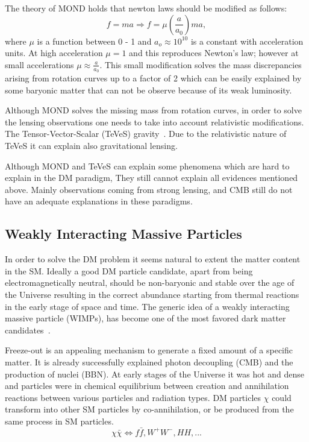 The theory of MOND holds that newton laws should be modified as follows:
\begin{equation}
	f= ma \Rightarrow f= \mu\left(\frac{a}{a_0}\right)ma,
\end{equation}
where $\mu$ is a function between 0 - 1 and $a_o \approx 10^{10}$ is a constant with acceleration units. At high acceleration $\mu =1$ and this reproduces Newton’s law; however at small accelerations $\mu \approx \frac{a}{a_0}$. This small modification solves the mass discrepancies arising from rotation curves up to a factor of 2 which can be easily explained by some baryonic matter that can not be observe because of its weak luminosity.

Although MOND solves the missing mass from rotation curves, in order to solve
the lensing observations one needs to take into account relativistic modifications. The Tensor-Vector-Scalar (TeVeS) gravity~\cite{Bekenstein:2009bd}. Due to the relativistic nature of TeVeS it can explain also gravitational
lensing.

Although MOND and TeVeS can explain some phenomena which are hard to explain in the DM paradigm, They still cannot explain all evidences mentioned above. Mainly observations coming from strong lensing, and CMB still do not have an adequate explanations in these paradigms.


\subsection{Weakly Interacting Massive Particles}
\label{subsec:WIMP}

In order to solve the DM problem it seems natural to extent the matter content in the SM. Ideally a good DM particle candidate, apart from being electromagnetically neutral, should be non-baryonic and stable over the age of the Universe resulting in the correct abundance starting from thermal reactions in the early stage of space and time. The generic idea of a weakly
interacting massive particle (WIMPs), has become one of the most favored dark
matter candidates~\cite{Steigman:1984ac}.

Freeze-out is an appealing mechanism to generate a fixed amount of a specific matter. It is already successfully explained photon decoupling (CMB) and the production of nuclei (BBN). At early stages of the Universe it was hot and dense and particles were in chemical equilibrium between creation and annihilation reactions between various particles and radiation types. DM particles $\chi$ could transform into other SM particles by co-annihilation, or be produced from the same process in SM particles.  
\begin{equation}
\chi\bar{\chi} \Leftrightarrow f\bar{f}, W^+W^-, HH, ...
\end{equation}

